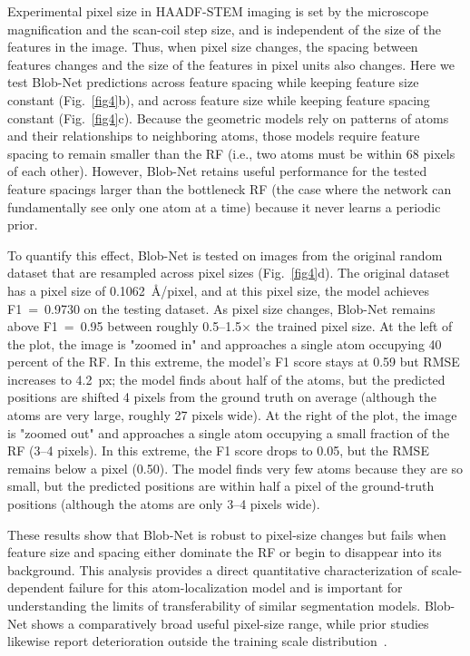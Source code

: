 Experimental pixel size in HAADF-STEM imaging is set by the microscope magnification and the scan-coil step size, and is independent of the size of the features in the image. Thus, when pixel size changes, the spacing between features changes and the size of the features in pixel units also changes. Here we test Blob-Net predictions across feature spacing while keeping feature size constant (Fig.~\ref{fig4}b), and across feature size while keeping feature spacing constant (Fig.~\ref{fig4}c). Because the geometric models rely on patterns of atoms and their relationships to neighboring atoms, those models require feature spacing to remain smaller than the RF (i.e., two atoms must be within 68 pixels of each other). However, Blob-Net retains useful performance for the tested feature spacings larger than the bottleneck RF (the case where the network can fundamentally see only one atom at a time) because it never learns a periodic prior.

To quantify this effect, Blob-Net is tested on images from the original random dataset that are resampled across pixel sizes (Fig.~\ref{fig4}d). The original dataset has a pixel size of 0.1062~\AA/pixel, and at this pixel size, the model achieves F1~=~0.9730 on the testing dataset. As pixel size changes, Blob-Net remains above F1~=~0.95 between roughly 0.5--1.5$\times$ the trained pixel size. At the left of the plot, the image is "zoomed in" and approaches a single atom occupying 40 percent of the RF. In this extreme, the model's F1 score stays at 0.59 but RMSE increases to 4.2~px; the model finds about half of the atoms, but the predicted positions are shifted 4 pixels from the ground truth on average (although the atoms are very large, roughly 27 pixels wide). At the right of the plot, the image is "zoomed out" and approaches a single atom occupying a small fraction of the RF (3--4 pixels). In this extreme, the F1 score drops to 0.05, but the RMSE remains below a pixel (0.50). The model finds very few atoms because they are so small, but the predicted positions are within half a pixel of the ground-truth positions (although the atoms are only 3--4 pixels wide).

These results show that Blob-Net is robust to pixel-size changes but fails when feature size and spacing either dominate the RF or begin to disappear into its background. This analysis provides a direct quantitative characterization of scale-dependent failure for this atom-localization model and is important for understanding the limits of transferability of similar segmentation models. Blob-Net shows a comparatively broad useful pixel-size range, while prior studies likewise report deterioration outside the training scale distribution~\cite{Wei2023Benchmark,Sytwu2024Generalization}.

